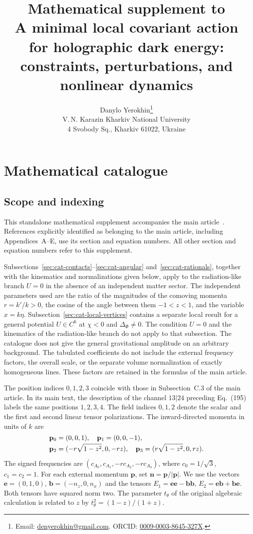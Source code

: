 \documentclass[11pt,a4paper]{article}
\title{Mathematical supplement to\\
A minimal local covariant action for holographic dark energy:\\
constraints, perturbations, and nonlinear dynamics}
\author{Danylo Yerokhin\thanks{Email: \href{mailto:denyerokhin@gmail.com}{denyerokhin@gmail.com}.
ORCID: \href{https://orcid.org/0009-0003-8645-327X}{0009-0003-8645-327X}.}\\[0.5em]
\normalsize V.\,N. Karazin Kharkiv National University\\
\normalsize 4 Svobody Sq., Kharkiv 61022, Ukraine}
\date{}
\begin{document}
\maketitle
\tableofcontents
\clearpage

\section{Mathematical catalogue}
\label{app:mathematical-catalogue}
\subsection{Scope and indexing}
\label{sec:cat-scope}
This standalone mathematical supplement accompanies the main article~\cite{YerokhinArticle}. References explicitly identified as belonging to the main article, including Appendices~A--E, use its section and equation numbers. All other section and equation numbers refer to this supplement.

Subsections~\ref{sec:cat-contacts}--\ref{sec:cat-angular} and~\ref{sec:cat-rationals}, together with the kinematics and normalizations given below, apply to the radiation-like branch $ U=0 $ in the absence of an independent matter sector. The independent parameters used are the ratio of the magnitudes of the comoving momenta $ r=k'/k>0 $, the cosine of the angle between them $ -1<z<1 $, and the variable $ x=k\eta $. Subsection~\ref{sec:cat-local-vertices} contains a separate local result for a general potential $ U\in C^6 $ at $ \chi<0 $ and $ \Delta_\Phi\ne0 $. The condition $ U=0 $ and the kinematics of the radiation-like branch do not apply to that subsection. The catalogue does not give the general gravitational amplitude on an arbitrary background. The tabulated coefficients do not include the external frequency factors, the overall scale, or the separate volume normalization of exactly homogeneous lines. These factors are retained in the formulas of the main article.

The position indices $0,1,2,3$ coincide with those in Subsection~C.3 of the main article. In its main text, the description of the channel $13|24$ preceding Eq.~(195) labels the same positions $1,2,3,4$. The field indices $0,1,2$ denote the scalar and the first and second linear tensor polarizations. The inward-directed momenta in units of $k$ are
\begin{equation}
\shortstack[l]{$\displaystyle \mathbf p_0=(0,0,1),\quad \mathbf p_1=(0,0,-1),$\\
$\displaystyle \mathbf p_2=(-r\sqrt{1-z^2},0,-rz),\quad \mathbf p_3=(r\sqrt{1-z^2},0,rz).$}
\label{eq:cat-momenta}
\end{equation}
The signed frequencies are $(c_{A_0},c_{A_1},-rc_{A_2},-rc_{A_3})$, where $c_0=1/\sqrt3$, $c_1=c_2=1$. For each external momentum $\mathbf p$, set $\mathbf n=\mathbf p/|\mathbf p|$. We use the vectors $\mathbf e=(0,1,0)$, $\mathbf b=(-n_z,0,n_x)$ and the tensors $E_1=\mathbf e\mathbf e-\mathbf b\mathbf b$, $E_2=\mathbf e\mathbf b+\mathbf b\mathbf e$. Both tensors have squared norm two. The parameter $t_\theta$ of the original algebraic calculation is related to $z$ by $t_\theta^2=(1-z)/(1+z)$.
\end{document}
